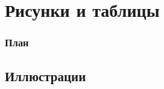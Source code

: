 \documentclass{beamer}
\begin{document}
\section{Рисунки и таблицы}

\begin{frame}
\frametitle{План}
\vspace{-3ex}
\begin{multicols}{2}
\tableofcontents[currentsection]
\end{multicols}
\end{frame}

\subsection{Иллюстрации}
\end{document}
